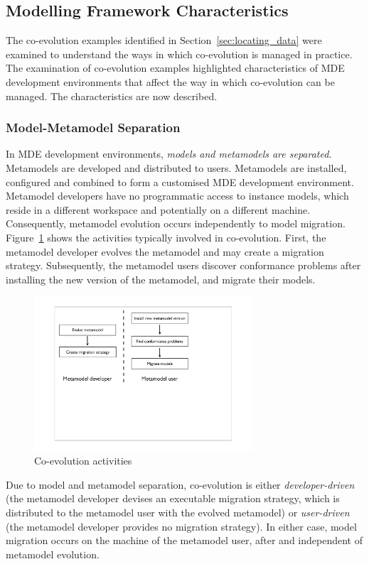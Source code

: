 \subsection{Modelling Framework Characteristics}
\label{subsec:modelling_framework_characteristics}
The co-evolution examples identified in Section~\ref{sec:locating_data} were examined to understand the ways in which co-evolution is managed in practice. The examination of co-evolution examples highlighted characteristics of MDE development environments that affect the way in which co-evolution can be managed. The characteristics are now described.

\subsubsection{Model-Metamodel Separation}
In MDE development environments, \emph{models and metamodels are separated}. Metamodels are developed and distributed to users. Metamodels are installed, configured and combined to form a customised MDE development environment. Metamodel developers have no programmatic access to instance models, which reside in a different workspace and potentially on a different machine. Consequently, metamodel evolution occurs independently to model migration. Figure~\ref{fig:co-evo_activities} shows the activities typically involved in co-evolution. First, the metamodel developer evolves the metamodel and may create a migration strategy. Subsequently, the metamodel users discover conformance problems after installing the new version of the metamodel, and migrate their models.

\begin{figure}[htbp]
	\centering
		\includegraphics*[viewport=80 250 600 550,height=5.75cm]{4.Analysis/images/co-evo_activities.pdf}
	\caption{Co-evolution activities}
	\label{fig:co-evo_activities}
\end{figure}

Due to model and metamodel separation, co-evolution is either \emph{developer-driven} (the metamodel developer devises an executable migration strategy, which is distributed to the metamodel user with the evolved metamodel) or \emph{user-driven} (the metamodel developer provides no migration strategy). In either case, model migration occurs on the machine of the metamodel user, after and independent of metamodel evolution.


